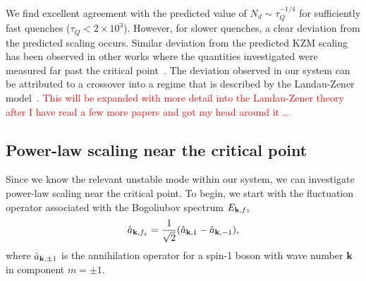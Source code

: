 We find excellent agreement with the predicted value of
\(N_d \sim \tau_Q^{-1/4}\) for sufficiently fast quenches (\(\tau_Q < 2
\times 10^3\)).
However, for slower quenches, a clear deviation from the predicted scaling
occurs.
Similar deviation from the predicted KZM scaling has been observed in other
works where the quantities investigated were measured far past the critical
point~\cite{Su2013, Swislocki2013}.
The deviation observed in our system can be attributed to a crossover into a
regime that is described by the Landau-Zener model~\cite{Zurek2005,Damski2005,
Pellegrini2008,Divakaran2008}.
\textcolor{red}{This will be expanded with more detail into the
Landau-Zener theory after I have read a few more papers and got my head around
it \ldots}

\subsection{Power-law scaling near the critical point}
Since we know the relevant unstable mode within our system, we can investigate
power-law scaling near the critical point.
To begin, we start with the fluctuation operator associated with the
Bogoliubov spectrum \(E_{\vb{k}, fz}\)
\begin{equation}
    \hat{a}_{\vb{k}, {f_z}} = \frac{1}{\sqrt{2}}(\hat{a}_{\vb{k}, 1}
    - \hat{a}_{\vb{k}, -1}),
    \label{eq: fz-fluctuation-operator}
\end{equation}
where \(\hat{a}_{\vb{k}, \pm1}\) is the annihilation operator for a spin-1 boson
with wave number \( \vb{k} \) in component \(m=\pm1\).
